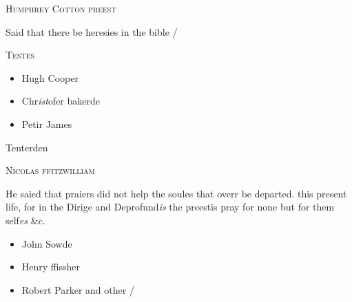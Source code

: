 \documentclass[12pt, a4paper]{book}
\begin{document}
		\ifthenelse{\isodd{\thepage}}
		{\reversemarginpar}
		{\normalmarginpar}
		

 

            
            	
				\begin{center} \begin{large} {\scshape Humphrey Cotton preest } \end{large} \end{center}
			
	
		\ifthenelse{\isodd{\thepage}}
		{\reversemarginpar}
		{\normalmarginpar}
		Said that there be heresies in the bible /
 
 	\begin{center} {\scshape Testes} \end{center}\begin{itemize}
 	
 		\item[]Hugh Cooper
 		\item[]Chr\textit{ist}ofer bakerde
 		\item[]Petir James
	\end{itemize}
 	
		\ifthenelse{\isodd{\thepage}}
		{\reversemarginpar}
		{\normalmarginpar}
		 Tenterden
 
 

            
               
				\begin{center} \begin{large} {\scshape Nicolas ffitzwilliam} \end{large} \end{center}
			
            	
            		
			
            		
		\ifthenelse{\isodd{\thepage}}
		{\reversemarginpar}
		{\normalmarginpar}
		He saied that praiers did not help the soules that overr 
 be departed. this present life, for in the Dirige
  and Deprofund\textit{is} the preestis pray for none but
 for them self\textit{es} \&c.

	\begin{itemize}
		\item[]John Sowde
		\item[]Henry ffissher
		\item[]Robert Parker and other /
	\end{itemize}
\end{document}
